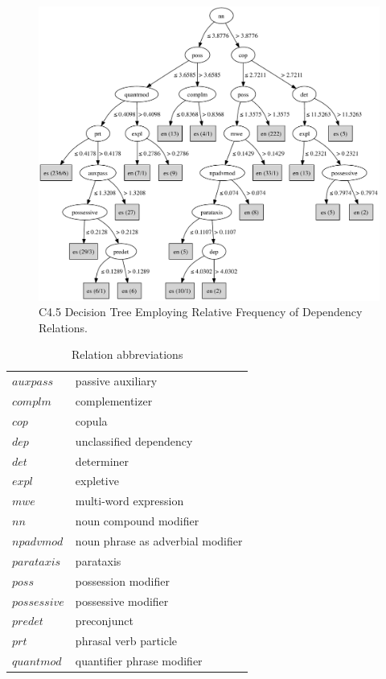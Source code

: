 \documentclass[main.tex]{subfiles}
\begin{document}
\begin{figure}[htbp]
\centering
\includegraphics[width=6in]{c45-dep-graph.pdf}
\caption{C4.5 Decision Tree Employing Relative Frequency of Dependency Relations.}
\label{fig:c4.5-dep-tree}
\end{figure}

\begin{table}[ht]
\small
\centering
\caption{Relation abbreviations}
\begin{tabular}{ l  l }
    \toprule
$auxpass$ & passive auxiliary \\
$complm$ & complementizer \\
$cop$ & copula \\
$dep$ & unclassified dependency \\
$det$ & determiner \\
$expl$ & expletive\\
$mwe$ & multi-word expression \\
$nn$ & noun compound modifier \\
$npadvmod$ & noun phrase as adverbial modifier \\
$parataxis$ & parataxis \\
$poss$ & possession modifier \\
$possessive$ & possessive modifier \\
$predet$ & preconjunct \\
$prt$ & phrasal verb particle \\
$quantmod$ & quantifier phrase modifier \\
\bottomrule
\end{tabular}
\label{table:reln-abbr}
\end{table}
\end{document}
